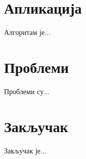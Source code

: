 \documentclass[a4paper]{article}
\begin{document}
\section{Апликација}

Алгоритам је...

\section{Проблеми}

Проблеми су...

\section{Закључак}

Закључак је...

\newpage
{}
\appendix


\end{document}
